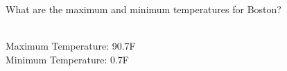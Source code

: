 What are the maximum and minimum temperatures for Boston?

\begin{solution}\ \\
Maximum Temperature: 90.7\degree F \\
Minimum Temperature: 0.7\degree F
\end{solution}